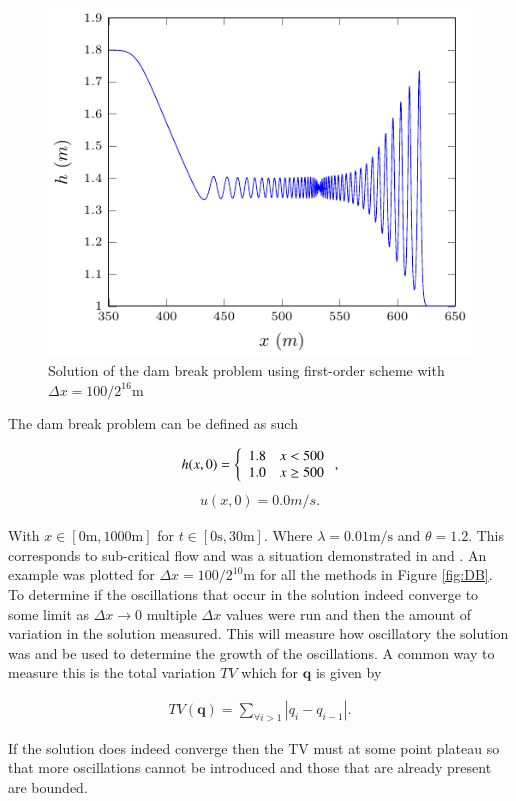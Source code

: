 \documentclass[SingleSpace,12pt]{Serre_ASCE}
\begin{document}
\begin{figure}[htb]
\centering
\includegraphics[width=15.0cm]{./results/dambreak/ex/o1-figure1.pdf}
\caption{Solution of the dam break problem using first-order scheme with $\Delta x = 100 /2^{16} \text{m}$ }
\label{fig:DB1o1}
\end{figure}
The dam break problem can be defined as such
\begin{linenomath*}
\begin{gather}
h(x,0) = \left\lbrace \begin{array}{c c}
1.8 & x < 500\\
1.0 & x \ge 500\\
\end{array} \right. ,
\end{gather}
\begin{gather}
u(x,0) = 0.0m/s.
\end{gather}
\end{linenomath*}
With $x \in \left[0\text{m},1000\text{m}\right]$ for $t \in \left[0\text{s},30\text{m}\right]$. Where $\lambda = 0.01 \text{m/s}$ and $\theta = 1.2$. This corresponds to sub-critical flow and was a situation demonstrated in  and . An example was plotted for $\Delta x = 100 /2^{10}\text{m}$ for all the methods in Figure \ref{fig:DB}. To determine if the oscillations that occur in the solution indeed converge to some limit as $\Delta x \rightarrow 0$ multiple $\Delta x$ values were run and then the amount of variation in the solution measured. This will measure how oscillatory the solution was and be used to determine the growth of the oscillations. A common way to measure this is the total variation $TV$ \cite{LeVeque-2002} which for $\boldsymbol{q}$ is given by
\begin{linenomath*}
\begin{gather}
TV(\boldsymbol{q}) = \sum_{\forall i >1} |q_{i} - q_{i-1}|.
\end{gather}
\end{linenomath*}
If the solution does indeed converge then the TV must at some point plateau so that more oscillations cannot be introduced and those that are already present are bounded.
\end{document}
